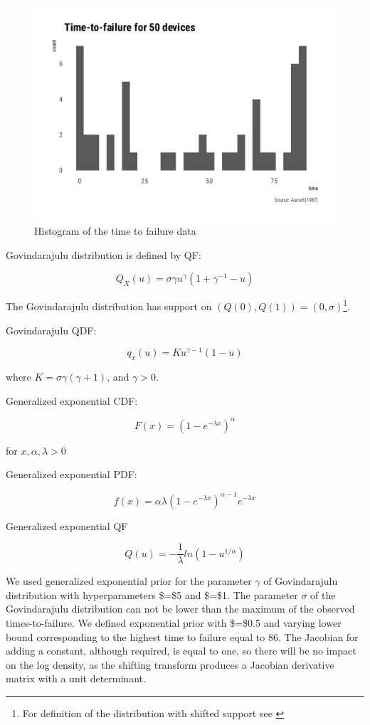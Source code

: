 \documentclass[
  12pt,
]{article}
\begin{document}
\begin{figure}

{\centering \includegraphics[width=0.5\linewidth]{ilbm_article_files/figure-latex/bathtub-hist-1} 

}

\caption{Histogram of the time to failure data}\label{fig:bathtub-hist}
\end{figure}

Govindarajulu distribution is defined by QF:

\[
Q_X(u)=\sigma\gamma u^\gamma(1+\gamma^{-1}-u)
\]

The Govindarajulu distribution has support on \((Q(0), Q(1))=(0, \sigma)\)\footnote{For definition of the distribution with shifted support see \citet{nair2012GovindarajuluDistributionProperties}}.

Govindarajulu QDF:

\[
q_x(u)=Ku^{\gamma-1}(1-u)
\]

where \(K=\sigma\gamma(\gamma+1)\), and \(\gamma>0\).

Generalized exponential CDF:

\[
F(x)=(1-e^{-\lambda x})^\alpha
\]

for \(x, \alpha, \lambda>0\)

Generalized exponential PDF:

\[
f(x)=\alpha\lambda(1-e^{-\lambda x})^{\alpha-1}e^{-\lambda x}
\]

Generalized exponential QF

\[
Q(u)=-\frac{1}{\lambda}ln(1-u^{1/\alpha})
\]

We used generalized exponential prior for the parameter \(\gamma\) of Govindarajulu distribution with hyperparameters \$\alpha=\$5 and \$\lambda=\$1. The parameter \(\sigma\) of the Govindarajulu distribution can not be lower than the maximum of the observed times-to-failure. We defined exponential prior with \$\lambda=\$0.5 and varying lower bound corresponding to the highest time to failure equal to 86. The Jacobian for adding a constant, although required, is equal to one, so there will be no impact on the log density, as the shifting transform produces a Jacobian derivative matrix with a unit determinant.
\end{document}
